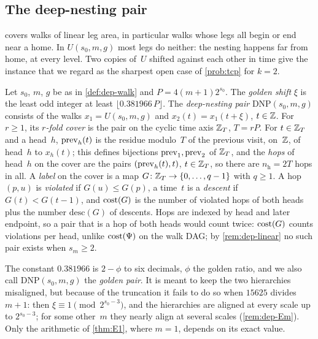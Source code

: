 \subsection{The deep-nesting pair}\label{sec:dep-dnp}

 covers walks of linear leg area, in particular walks whose legs all begin or end near a home. In
$U(s_0,m,g)$ most legs do neither: the nesting happens far from home, at every level. Two copies of~$U$ shifted
against each other in time give the instance that we regard as the sharpest open case of \cref{prob:tcp} for $k=2$.

\begin{definition}\label{def:dnp}
Let $s_0$, $m$, $g$ be as in \cref{def:dep-walk} and $P=4(m+1)2^{s_0}$. The \emph{golden shift} $\xi$ is the least odd
integer at least $\lfloor0.381966\,P\rfloor$. The \emph{deep-nesting pair} $\mathrm{DNP}(s_0,m,g)$ consists of the
walks $x_1=U(s_0,m,g)$ and $x_2(t)=x_1(t+\xi)$, $t\in\mathbb{Z}$. For $r\ge1$, its \emph{$r$-fold cover} is the pair on the
cyclic time axis $\mathbb{Z}_T$, $T=rP$. For $t\in\mathbb{Z}_T$ and a head~$h$, $\mathrm{prev}_h(t)$ is the residue modulo~$T$ of the previous
visit, on~$\mathbb{Z}$, of head~$h$ to $x_h(t)$; this defines bijections $\mathrm{prev}_1,\mathrm{prev}_2$ of $\mathbb{Z}_T$, and the \emph{hops} of
head~$h$ on the cover are the pairs $(\mathrm{prev}_h(t),t)$, $t\in\mathbb{Z}_T$, so there are $n_{\mathrm h}=2T$ hops in all. A
\emph{label} on the cover is a map $G\colon\mathbb{Z}_T\to\{0,\dots,q-1\}$ with $q\ge1$. A hop $(p,u)$ is \emph{violated} if
$G(u)\le G(p)$, a time~$t$ is a \emph{descent} if $G(t)<G(t-1)$, and $\mathrm{cost}(G)$ is the number of violated hops of both
heads plus the number $\mathrm{desc}(G)$ of descents. Hops are indexed by head and later endpoint, so a pair that is a
hop of both heads would count twice: $\mathrm{cost}(G)$ counts violations per head, unlike $\mathrm{cost}(\Psi)$ on the walk DAG;
by \cref{rem:dep-linear} no such pair exists when $s_m\ge2$.
\end{definition}

The constant $0.381966$ is $2-\phi$ to six decimals, $\phi$ the golden ratio, and we also call $\mathrm{DNP}(s_0,m,g)$
the \emph{golden pair}. It is meant to keep the two hierarchies
misaligned, but because of the truncation it fails to do so when $15625$ divides $m+1$: then $\xi\equiv1\pmod{2^{s_0-3}}$,
and the hierarchies are aligned at every scale up to $2^{s_0-3}$; for some other~$m$ they nearly align at several
scales (\cref{rem:dep-Em}). Only the arithmetic of \cref{thm:E1}, where $m=1$,
depends on its exact value.

